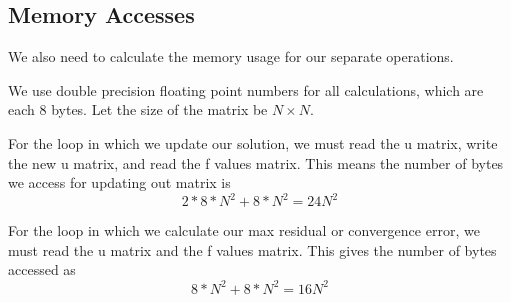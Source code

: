 \documentclass[11pt]{article}
\begin{document}
\subsection*{Memory Accesses}

We also need to calculate the memory usage for our separate operations. 

We use double precision floating point numbers for all calculations, which are each 8 bytes. Let the size of the matrix be $N \times N$.

For the loop in which we update our solution, we must read the u matrix, write the new u matrix, and read the f values matrix. This means the number of bytes we access for updating out matrix is
\[
    2 * 8 * N^2 + 8 * N^2 = 24N^2
\]

For the loop in which we calculate our max residual or convergence error, we must read the u matrix and the f values matrix. This gives the number of bytes accessed as
\[
    8 * N^2 + 8 * N^2 = 16N^2
\]
\end{document}
